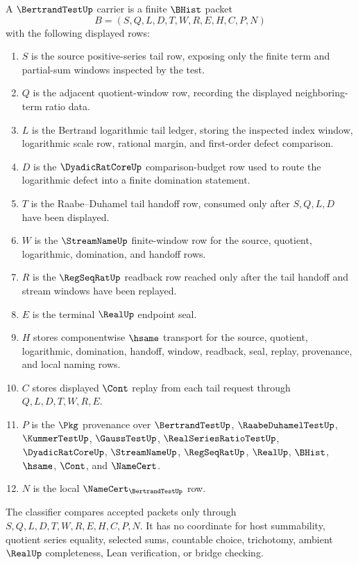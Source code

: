 \begin{definition}
\label{def:bertrand-test-carrier}
A $\BertrandTestUp$ carrier is a finite $\BHist$ packet
$$
B=(S,Q,L,D,T,W,R,E,H,C,P,N)
$$
with the following displayed rows:
\begin{enumerate}
\item $S$ is the source positive-series tail row, exposing only the finite term and partial-sum windows inspected by the test.
\item $Q$ is the adjacent quotient-window row, recording the displayed neighboring-term ratio data.
\item $L$ is the Bertrand logarithmic tail ledger, storing the inspected index window, logarithmic scale row, rational margin, and first-order defect comparison.
\item $D$ is the $\DyadicRatCoreUp$ comparison-budget row used to route the logarithmic defect into a finite domination statement.
\item $T$ is the Raabe--Duhamel tail handoff row, consumed only after $S,Q,L,D$ have been displayed.
\item $W$ is the $\StreamNameUp$ finite-window row for the source, quotient, logarithmic, domination, and handoff rows.
\item $R$ is the $\RegSeqRatUp$ readback row reached only after the tail handoff and stream windows have been replayed.
\item $E$ is the terminal $\RealUp$ endpoint seal.
\item $H$ stores componentwise $\hsame$ transport for the source, quotient, logarithmic, domination, handoff, window, readback, seal, replay, provenance, and local naming rows.
\item $C$ stores displayed $\Cont$ replay from each tail request through $Q,L,D,T,W,R,E$.
\item $P$ is the $\Pkg$ provenance over $\BertrandTestUp$, $\RaabeDuhamelTestUp$, $\KummerTestUp$, $\GaussTestUp$, $\RealSeriesRatioTestUp$, $\DyadicRatCoreUp$, $\StreamNameUp$, $\RegSeqRatUp$, $\RealUp$, $\BHist$, $\hsame$, $\Cont$, and $\NameCert$.
\item $N$ is the local $\NameCert_{\BertrandTestUp}$ row.
\end{enumerate}
The classifier compares accepted packets only through $S,Q,L,D,T,W,R,E,H,C,P,N$. It has no coordinate for host summability, quotient series equality, selected sums, countable choice, trichotomy, ambient $\RealUp$ completeness, Lean verification, or bridge checking.
\end{definition}

